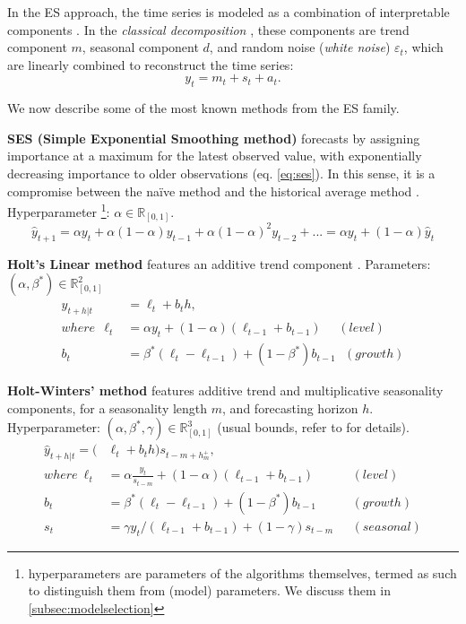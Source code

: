 In the ES approach, the time series is modeled as a combination of interpretable components \cite{brockwell1990methods}.
In the \textit{classical decomposition} \cite{makridakis1997arma}, these components are trend component $m$, seasonal component $d$, and random noise (\textit{white noise}) $\varepsilon_t$, which are linearly combined to reconstruct the time series:
\begin{equation}\label{eq:ts_classical_decomp}
    y_t = m_t + s_t + a_t .
\end{equation}

We now describe some of the most known methods from the ES family.

\noindent
\textbf{SES (Simple Exponential Smoothing method)} forecasts by assigning importance at a maximum for the latest observed value, with exponentially decreasing importance to older observations (eq. \ref{eq:ses}).
In this sense, it is a compromise between the naïve method and the historical average method \cite{hyndman2018principles}.
Hyperparameter \footnote[1]{hyperparameters are parameters of the algorithms themselves, termed as such to distinguish them from (model) parameters. We discuss them in \ref{subsec:modelselection}}: $\alpha \in \mathbb{R}_{[0,1]}$.
\begin{equation}\label{eq:ses}
    \hat{y}_{t+1} = \alpha y_{t} + \alpha (1-\alpha) y_{t-1} + \alpha (1-\alpha)^2 y_{t-2} + ... = \alpha y_{t} + (1-\alpha) \hat{y}_{t}
\end{equation}

\noindent
\textbf{Holt's Linear method} features an additive trend component \cite{hyndman2008es}. Parameters: $(\alpha, \beta^*) \in \mathbb{R}^2_{[0,1]}$
\begin{equation}\label{eq:holt_linear}
    \begin{aligned}
    \hat{y}_{t+h|t} &= \ell_t + b_th, \\
    where\ \  \ell_t &= \alpha y_t + (1-\alpha)(\ell_{t-1}+b_{t-1}) \ \ \ \ \ \ (level) \\
    b_t &= \beta^*(\ell_t - \ell_{t-1}) + (1-\beta^*)b_{t-1} \ \ \ (growth)
    \end{aligned}
\end{equation}

\noindent
\textbf{Holt-Winters' method} features additive trend and multiplicative seasonality components, for a seasonality length $m$, and forecasting horizon $h$.
Hyperparameter: $(\alpha, \beta^*,\gamma) \in \mathbb{R}^3_{[0,1]}$ (usual bounds, refer to \cite{hyndman2008es} for details).
\begin{equation}\label{eq:hs_method}
    \begin{aligned}
    \hat{y}_{t+h|t} = (&\ell_t + b_th)s_{t-m+h^+_m}, \\
    where \ \ell_t &= \alpha \frac{y_t}{s_{t-m}} + (1-\alpha)(\ell_{t-1}+b_{t-1})   &(level) \\
    b_t &= \beta^*(\ell_t - \ell_{t-1}) + (1-\beta^*)b_{t-1} &(growth) \\
    s_t &= \gamma y_t/(\ell_{t-1}+b_{t-1}) + (1-\gamma)s_{t-m} \ \ \ &(seasonal)
    \end{aligned}
\end{equation}

